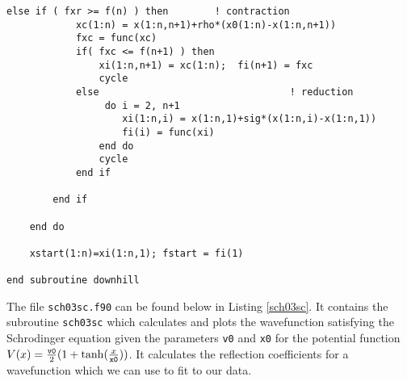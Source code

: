 \documentclass[12pt]{article}
\begin{document}
\begin{lstlisting}[frame=single,caption={{\tt downhill-p.f90}},label=downhill-p2]
        else if ( fxr >= f(n) ) then        ! contraction
            xc(1:n) = x(1:n,n+1)+rho*(x0(1:n)-x(1:n,n+1))
            fxc = func(xc)
            if( fxc <= f(n+1) ) then
                xi(1:n,n+1) = xc(1:n);  fi(n+1) = fxc
                cycle
            else                                 ! reduction
                 do i = 2, n+1
                    xi(1:n,i) = x(1:n,1)+sig*(x(1:n,i)-x(1:n,1))
                    fi(i) = func(xi)
                end do
                cycle
            end if
            
        end if
        
    end do
    
    xstart(1:n)=xi(1:n,1); fstart = fi(1)

end subroutine downhill

\end{lstlisting}

The file {\tt sch03sc.f90} can be found below in Listing \ref{sch03sc}.  It contains the subroutine {\tt sch03sc} which calculates and plots the wavefunction satisfying the Schrodinger equation given the parameters {\tt v0} and {\tt x0} for the potential function $V(x)=\frac{{\tt v0}}{2}(1+\tanh(\frac{x}{{\tt x0}}))$.  It calculates the reflection coefficients for a wavefunction which we can use to fit to our data.  
\end{document}

